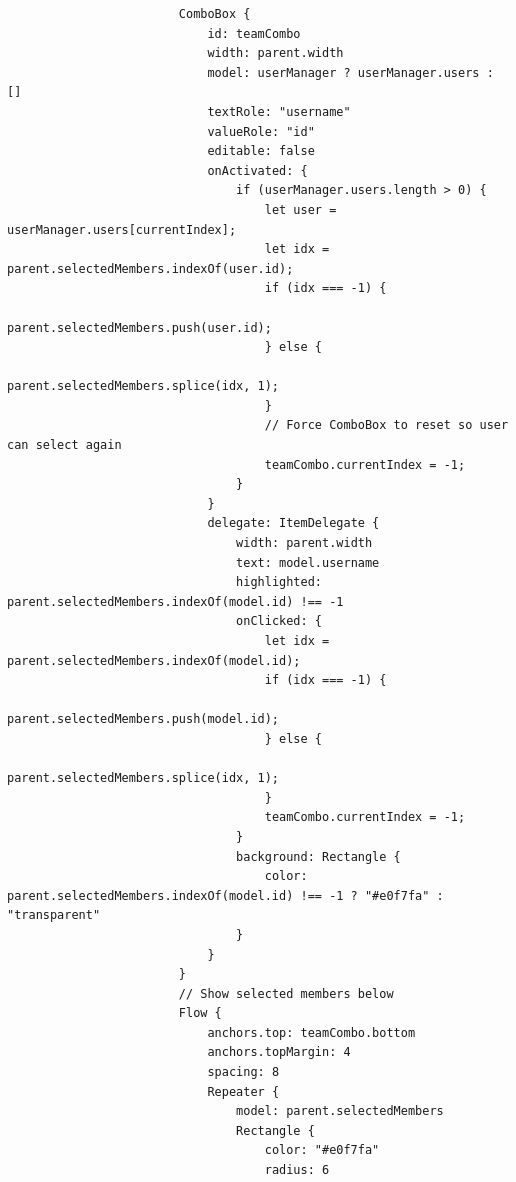 \documentclass{report}
\begin{document}
\begin{lstlisting}
                        ComboBox {
                            id: teamCombo
                            width: parent.width
                            model: userManager ? userManager.users : []
                            textRole: "username"
                            valueRole: "id"
                            editable: false
                            onActivated: {
                                if (userManager.users.length > 0) {
                                    let user = userManager.users[currentIndex];
                                    let idx = parent.selectedMembers.indexOf(user.id);
                                    if (idx === -1) {
                                        parent.selectedMembers.push(user.id);
                                    } else {
                                        parent.selectedMembers.splice(idx, 1);
                                    }
                                    // Force ComboBox to reset so user can select again
                                    teamCombo.currentIndex = -1;
                                }
                            }
                            delegate: ItemDelegate {
                                width: parent.width
                                text: model.username
                                highlighted: parent.selectedMembers.indexOf(model.id) !== -1
                                onClicked: {
                                    let idx = parent.selectedMembers.indexOf(model.id);
                                    if (idx === -1) {
                                        parent.selectedMembers.push(model.id);
                                    } else {
                                        parent.selectedMembers.splice(idx, 1);
                                    }
                                    teamCombo.currentIndex = -1;
                                }
                                background: Rectangle {
                                    color: parent.selectedMembers.indexOf(model.id) !== -1 ? "#e0f7fa" : "transparent"
                                }
                            }
                        }
                        // Show selected members below
                        Flow {
                            anchors.top: teamCombo.bottom
                            anchors.topMargin: 4
                            spacing: 8
                            Repeater {
                                model: parent.selectedMembers
                                Rectangle {
                                    color: "#e0f7fa"
                                    radius: 6

\end{lstlisting}
\end{document}
